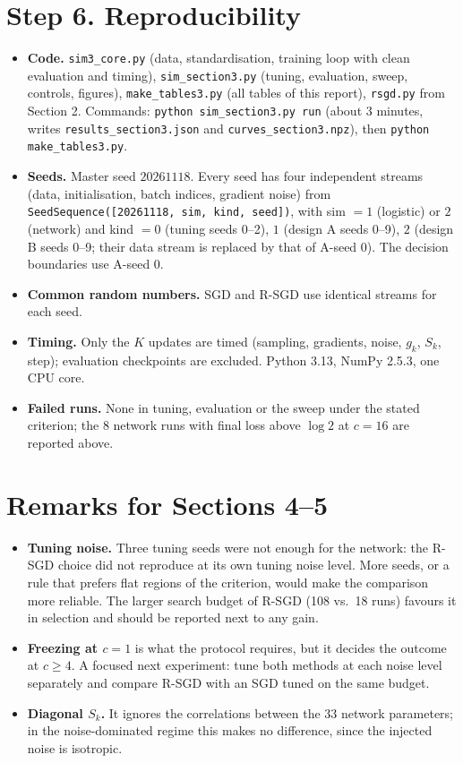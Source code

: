 \documentclass[11pt,a4paper]{article}
\begin{document}
\section*{Step 6. Reproducibility}

\begin{itemize}
\item \textbf{Code.} \texttt{sim3\_core.py} (data, standardisation, training loop with clean
evaluation and timing), \texttt{sim\_section3.py} (tuning, evaluation, sweep, controls, figures),
\texttt{make\_tables3.py} (all tables of this report), \texttt{rsgd.py} from Section 2. Commands:
\texttt{python sim\_section3.py run} (about 3 minutes, writes \texttt{results\_section3.json} and
\texttt{curves\_section3.npz}), then \texttt{python make\_tables3.py}.
\item \textbf{Seeds.} Master seed $20261118$. Every seed has four independent streams (data,
initialisation, batch indices, gradient noise) from
\texttt{SeedSequence([20261118, sim, kind, seed])}, with sim $=1$ (logistic) or $2$ (network)
and kind $=0$ (tuning seeds 0--2), $1$ (design A seeds 0--9), $2$ (design B seeds 0--9; their
data stream is replaced by that of A-seed 0). The decision boundaries use A-seed 0.
\item \textbf{Common random numbers.} SGD and R-SGD use identical streams for each seed.
\item \textbf{Timing.} Only the $K$ updates are timed (sampling, gradients, noise, $g_k$, $S_k$,
step); evaluation checkpoints are excluded. Python 3.13, NumPy 2.5.3, one CPU core.
\item \textbf{Failed runs.} None in tuning, evaluation or the sweep under the stated criterion;
the 8 network runs with final loss above $\log2$ at $c=16$ are reported above.
\end{itemize}

\section*{Remarks for Sections 4--5}

\begin{itemize}
\item \textbf{Tuning noise.} Three tuning seeds were not enough for the network: the R-SGD
choice did not reproduce at its own tuning noise level. More seeds, or a rule that prefers flat
regions of the criterion, would make the comparison more reliable. The larger search budget of
R-SGD (108 vs.\ 18 runs) favours it in selection and should be reported next to any gain.
\item \textbf{Freezing at $c=1$} is what the protocol requires, but it decides the outcome at
$c\ge4$. A focused next experiment: tune both methods at each noise level separately and compare
R-SGD with an SGD tuned on the same budget.
\item \textbf{Diagonal $S_k$.} It ignores the correlations between the 33 network parameters;
in the noise-dominated regime this makes no difference, since the injected noise is isotropic.
\end{itemize}
\end{document}
